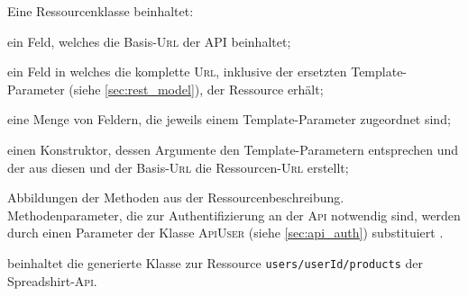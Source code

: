 Eine Ressourcenklasse beinhaltet:
\begin{compactitem}
    \item[\ding{202}] ein Feld, welches die Basis-\textsc{Url} der API beinhaltet;
    \item[\ding{203}] ein Feld in welches die komplette \textsc{Url}, inklusive der ersetzten Template-Parameter (siehe \cref{sec:rest_model}), der Ressource erhält;
    \item[\ding{204}] eine Menge von Feldern, die jeweils einem Template-Parameter zugeordnet sind;
    \item[\ding{205}] einen Konstruktor, dessen Argumente den Template-Parametern entsprechen und der aus diesen und der Basis-\textsc{Url} die Ressourcen-\textsc{Url} erstellt;
    \item[\ding{206}] Abbildungen der Methoden aus der Ressourcenbeschreibung. Methodenparameter, die zur Authentifizierung an der \textsc{Api} notwendig sind, werden durch einen Parameter der Klasse \textsc{ApiUser} (siehe \cref{sec:api_auth}) substituiert .
\end{compactitem}

 beinhaltet die generierte Klasse zur Ressource \texttt{users/{userId}/products} der Spreadshirt-\textsc{Api}.


